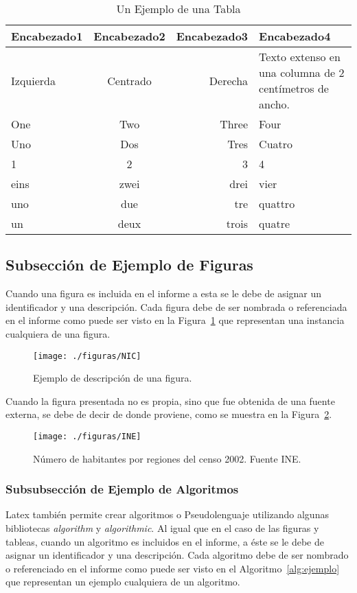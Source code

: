 \documentclass[journal]{IEEEtran}
\begin{document}
\begin{table}[!ht]
\caption{Un Ejemplo de una Tabla}
\label{tab:ejemplo}
\centering
\begin{tabular}{|l|c|r|p{2cm}|}
\hline
Encabezado1 & Encabezado2 & Encabezado3 & Encabezado4 \\
\hline \hline
Izquierda & Centrado & Derecha & Texto extenso en una columna de 2 centímetros de ancho.\\
\hline
One & Two & Three & Four\\
\hline
Uno & Dos & Tres & Cuatro\\
\hline
1 & 2 & 3 & 4\\
\hline
eins & zwei & drei & vier\\
\hline
uno & due & tre & quattro\\
\hline
un & deux & trois & quatre\\
\hline
\end{tabular}
\end{table}

\subsection{Subsección de Ejemplo de Figuras}
Cuando una figura es incluida en el informe a esta se le debe de asignar un identificador y una descripción. Cada figura debe de ser nombrada o referenciada en el informe como puede ser visto en la Figura~\ref{fig:sim} que representan una instancia cualquiera de una figura.

\begin{figure}[!ht]
\centering
\texttt{[image: ./figuras/NIC]}
\caption{Ejemplo de descripción de una figura.}
\label{fig:sim}
\end{figure}

Cuando la figura presentada no es propia, sino que fue obtenida de una fuente externa, se debe de decir de donde proviene, como se muestra en la Figura~\ref{fig:ine}.


\begin{figure}[!ht]
\centering
\texttt{[image: ./figuras/INE]}
\caption{Número de habitantes por regiones del censo 2002. Fuente INE.}
\label{fig:ine}
\end{figure}



\subsubsection{Subsubsección de Ejemplo de Algoritmos}
Latex también permite crear algoritmos o Pseudolenguaje utilizando algunas bibliotecas \emph{algorithm} y \emph{algorithmic}. Al igual que en el caso de las figuras y tableas, cuando un algoritmo es incluidos en el informe, a éste se le debe de asignar un identificador y una descripción. Cada algoritmo debe de ser nombrado o referenciado en el informe como puede ser visto en el Algoritmo~\ref{alg:ejemplo} que representan un ejemplo cualquiera de un algoritmo.
\end{document}
